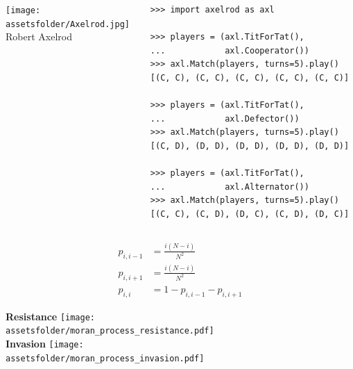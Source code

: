 \documentclass{beamer}
\newcommand{\assetsfolder}{./assets}
\newcommand{\researchfolder}{$HOME/rsc/axelrod-moran}
\begin{document}
    \begin{frame}[fragile]{}
        \begin{columns}
            \begin{column}{.4\textwidth}
                \begin{center}
                    \texttt{[image: \\assetsfolder/Axelrod.jpg]}
                    \\
                    Robert Axelrod
                \end{center}
            \end{column}
            \pause
            \begin{column}{.6\textwidth}
                \begin{verbatim}
>>> import axelrod as axl

>>> players = (axl.TitForTat(),
...            axl.Cooperator())
>>> axl.Match(players, turns=5).play()
[(C, C), (C, C), (C, C), (C, C), (C, C)]

>>> players = (axl.TitForTat(),
...            axl.Defector())
>>> axl.Match(players, turns=5).play()
[(C, D), (D, D), (D, D), (D, D), (D, D)]

>>> players = (axl.TitForTat(),
...            axl.Alternator())
>>> axl.Match(players, turns=5).play()
[(C, C), (C, D), (D, C), (C, D), (D, C)]

                \end{verbatim}
            \end{column}
        \end{columns}
\end{frame}


    \begin{frame}
        \begin{center}
            \scalebox{.6}{}
        \end{center}

		\pause

		  \begin{align*}
			  p_{i, i-1}&=\frac{i(N - i)}{N^2}\\
			  p_{i, i+1}&=\frac{i(N - i)}{N^2}\\
			  p_{i, i}&=1 - p_{i, i-1} - p_{i, i+1}
		  \end{align*}

    \end{frame}

\begin{frame}

    \begin{center}
        \textbf{Resistance}
        \texttt{[image: \\assetsfolder/moran\_process\_resistance.pdf]}\\

        \textbf{Invasion}
        \texttt{[image: \\assetsfolder/moran\_process\_invasion.pdf]}
    \end{center}
\end{frame}
\end{document}

